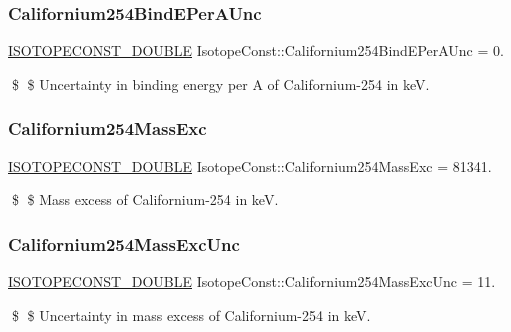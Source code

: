 \subsubsection{\texorpdfstring{Californium254\+Bind\+E\+Per\+A\+Unc}{Californium254BindEPerAUnc}}
{\footnotesize\ttfamily \mbox{\hyperlink{group___isotope_const-_macros_ga8f45a7272ce02c0b4c65c44636ed719a}{I\+S\+O\+T\+O\+P\+E\+C\+O\+N\+S\+T\+\_\+\+D\+O\+U\+B\+LE}} Isotope\+Const\+::\+Californium254\+Bind\+E\+Per\+A\+Unc = 0.}

\$ \$ Uncertainty in binding energy per A of Californium-\/254 in keV. \mbox{\label{group___isotope_const-_californium-_cf254_gac16ac95444d8e015202cd73c83f217c6}} 
\subsubsection{\texorpdfstring{Californium254\+Mass\+Exc}{Californium254MassExc}}
{\footnotesize\ttfamily \mbox{\hyperlink{group___isotope_const-_macros_ga8f45a7272ce02c0b4c65c44636ed719a}{I\+S\+O\+T\+O\+P\+E\+C\+O\+N\+S\+T\+\_\+\+D\+O\+U\+B\+LE}} Isotope\+Const\+::\+Californium254\+Mass\+Exc = 81341.}

\$ \$ Mass excess of Californium-\/254 in keV. \mbox{\label{group___isotope_const-_californium-_cf254_ga8923a2bf68a91483801ed8de162ee392}} 
\subsubsection{\texorpdfstring{Californium254\+Mass\+Exc\+Unc}{Californium254MassExcUnc}}
{\footnotesize\ttfamily \mbox{\hyperlink{group___isotope_const-_macros_ga8f45a7272ce02c0b4c65c44636ed719a}{I\+S\+O\+T\+O\+P\+E\+C\+O\+N\+S\+T\+\_\+\+D\+O\+U\+B\+LE}} Isotope\+Const\+::\+Californium254\+Mass\+Exc\+Unc = 11.}

\$ \$ Uncertainty in mass excess of Californium-\/254 in keV. \mbox{\label{group___isotope_const-_californium-_cf254_gaa3d11e9fb2a18ad59194f0b610e022b3}} 
